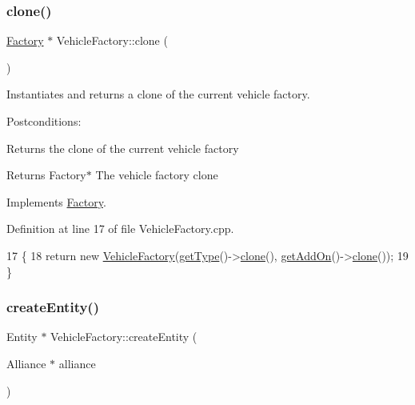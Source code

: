 \subsubsection{\texorpdfstring{clone()}{clone()}}
{\footnotesize\ttfamily \hyperlink{classFactory}{Factory} $\ast$ Vehicle\+Factory\+::clone (\begin{DoxyParamCaption}{ }\end{DoxyParamCaption})\hspace{0.3cm}{\ttfamily [virtual]}}



Instantiates and returns a clone of the current vehicle factory. 

Postconditions\+:
\begin{DoxyItemize}
\item Returns the clone of the current vehicle factory
\end{DoxyItemize}

\begin{DoxyReturn}{Returns}
Factory$\ast$ The vehicle factory clone 
\end{DoxyReturn}


Implements \hyperlink{classFactory_a00881ec5050751e4b747db5dfd266192}{Factory}.



Definition at line 17 of file Vehicle\+Factory.\+cpp.


\begin{DoxyCode}
17                                \{
18     \textcolor{keywordflow}{return} \textcolor{keyword}{new} \hyperlink{classVehicleFactory_a9bc9faf52aef1ad02193b3640b661f59}{VehicleFactory}(\hyperlink{classFactory_ac91051006ace7ec5bb6ecf0fe6d02d58}{getType}()->\hyperlink{classVehicleFactory_a6d874e37b573b491a49e303209ac42cd}{clone}(), 
      \hyperlink{classFactory_a994153930f59cafb280e91d5b100b5aa}{getAddOn}()->\hyperlink{classVehicleFactory_a6d874e37b573b491a49e303209ac42cd}{clone}());
19 \}
\end{DoxyCode}
\mbox{\label{classVehicleFactory_a3f34221921fd58cf83fd9bc8e3d8798f}} 
\subsubsection{\texorpdfstring{create\+Entity()}{createEntity()}}
{\footnotesize\ttfamily Entity $\ast$ Vehicle\+Factory\+::create\+Entity (\begin{DoxyParamCaption}\item[{Alliance $\ast$}]{alliance }\end{DoxyParamCaption})\hspace{0.3cm}{\ttfamily [virtual]}}



